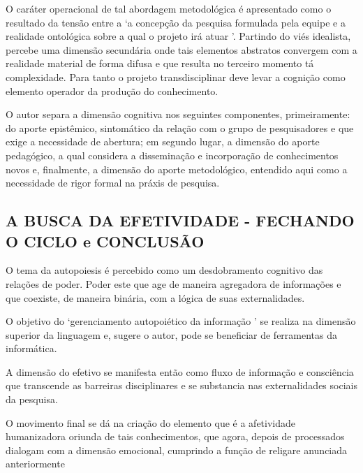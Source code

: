 \documentclass[
   article,       %
   12pt,          %
   oneside,       %
   a4paper,       %
   english,       %
   brazil,           %
   sumario=tradicional
   ]{abntex2}
\begin{document}
O caráter operacional de tal abordagem metodológica é apresentado como o resultado da tensão entre a ‘a concepção da pesquisa formulada pela equipe e a realidade
ontológica sobre a qual o projeto irá atuar \cite[p. 90]{Paradigma_Transdisciplinar_Metodologica}’. Partindo do viés idealista, percebe uma dimensão secundária onde tais elementos abstratos convergem com a realidade material de forma difusa e que resulta no terceiro momento tá complexidade. Para tanto o projeto transdisciplinar deve levar a cognição como elemento operador da produção do conhecimento.

O autor separa a dimensão cognitiva nos seguintes componentes, primeiramente: do aporte epistêmico, sintomático da relação com o grupo de pesquisadores e que exige a necessidade de abertura; em segundo lugar, a dimensão do aporte pedagógico, a qual considera a disseminação e incorporação de conhecimentos novos e, finalmente, a dimensão do aporte metodológico, entendido aqui como a necessidade de rigor formal na práxis de pesquisa.


\subsection{A BUSCA DA EFETIVIDADE - FECHANDO O CICLO e CONCLUSÃO}

O tema da autopoiesis é percebido como um desdobramento cognitivo das relações de poder. Poder este que age de maneira agregadora de informações e que coexiste, de maneira binária, com a lógica de suas externalidades.

O objetivo do ‘gerenciamento autopoiético da informação \cite[p. 91]{Paradigma_Transdisciplinar_Metodologica}’ se realiza na dimensão superior da linguagem e, sugere o autor, pode se beneficiar de ferramentas da informática.

A dimensão do efetivo se manifesta então como fluxo de informação e consciência que transcende as barreiras disciplinares e se substancia nas externalidades sociais da pesquisa.

O movimento final se dá na criação do elemento que é a afetividade humanizadora oriunda de tais conhecimentos, que agora, depois de processados dialogam com a dimensão emocional, cumprindo a função de religare anunciada anteriormente

\postextual


\end{document}
